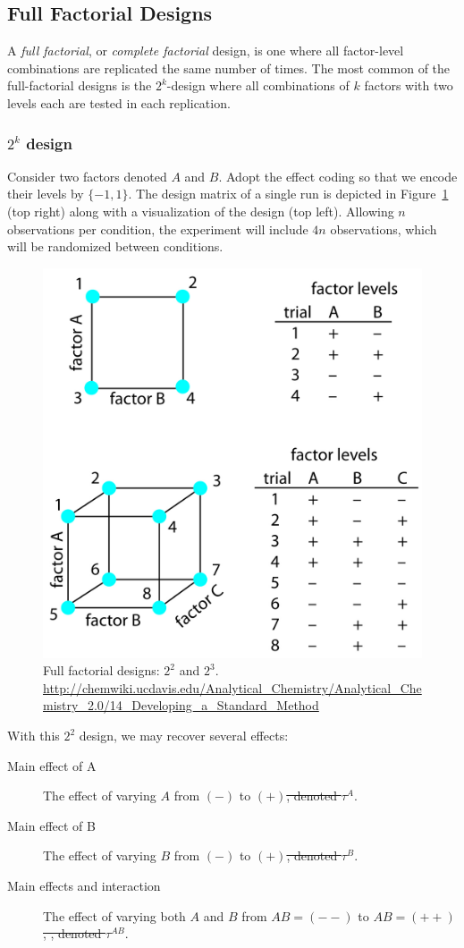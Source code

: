 \documentclass[12pt,a4paper]{report}
\theoremstyle{plain}
\theoremstyle{definition}
\newcommand{\set}[1]{\{ #1 \}} \newcommand{\setII}[1]{\left\{ #1 \right\}} \newcommand{\rv}[1]{\mathbf{#1}} \newcommand{\x}{\rv x} \newcommand{\y}{\rv y} \newcommand{\U}{\rv u} \newcommand{\T}{\rv t} \newcommand{\X}{\rv X} \newcommand{\Y}{\rv Y} \newcommand{\expect}[1]{\mathbf{E}\left[ #1 \right]} \newcommand{\expectg}[2]{\mathbf{E}_{\rv{#1}}\left[ \rv{#2} \right]} \newcommand{\expectn}[1]{\mathbb{E}\left[#1\right]} \newcommand{\cov}[1]{\mathbf{Cov} \left[ #1 \right]} \newcommand{\var}[1]{\mathop{Var} \left[ #1 \right]} \newcommand{\covn}[1]{\mathbb{Cov} \left[ #1 \right]} \newcommand{\gauss}[1]{\mathcal{N}\left(#1\right)} \newcommand{\cdf}[2]{F_{#1} (#2)} \newcommand{\survive}[2]{S_{#1} (#2)} \newcommand{\hazard}[2]{h_{#1} (#2)} \newcommand{\cuhazard}[2]{H_{#1} (#2)} \newcommand{\cdfn}[2]{\mathbb{F}_{#1}(#2)} \newcommand{\icdf}[2]{F_\rv{#1}^{-1} (#2)} \newcommand{\icdfn}[2]{\mathbb{F}^{-1}_{#1}(#2)} \newcommand{\pdf}[2]{p_{#1} (#2)} \newcommand{\prob}[1]{P\left( #1 \right)} \newcommand{\dist}{P} \newcommand{\density}{p}
\providecommand{\DIFdeltex}[1]{{\protect\color{red}\sout{#1}}}                      %
\providecommand{\DIFdelbegin}{} %
\providecommand{\DIFdelend}{} %
\providecommand{\DIFdel}[1]{\texorpdfstring{\DIFdeltex{#1}}{}} %
\begin{document}
\subsection{Full Factorial Designs}
A \emph{full factorial}, or \emph{complete factorial} design, is one where all factor-level combinations are replicated the same number of times.
The most common of the full-factorial designs is the $2^k$-design where all combinations of $k$ factors with two levels each are tested in each replication.



\subsubsection{$2^k$ design}
Consider two factors denoted $A$ and $B$.
Adopt the effect coding so that we encode their levels by $\set{-1,1}$.
The design matrix of a single run is depicted in Figure~\ref{fig:full_factorial} (top right) along with a visualization of the design (top left).
Allowing $n$ observations per condition, the experiment will include $4n$ observations, which will be randomized between conditions.

\begin{figure}[ht]
\centering
\includegraphics[width=0.7\linewidth, height=0.3\textheight]{art/full_factorial}
\caption[Full Factorial Design]{Full factorial designs: $2^2$ and $2^3$. \newline \url{http://chemwiki.ucdavis.edu/Analytical_Chemistry/Analytical_Chemistry_2.0/14_Developing_a_Standard_Method}}
\label{fig:full_factorial}
\end{figure}
With this $2^2$ design, we may recover several effects:
\begin{description}
\item [Main effect of A] The effect of varying $A$ from $(-)$ to $(+)$\DIFdelbegin \DIFdel{, denoted $\tau^A$}\DIFdelend .
\item [Main effect of B] The effect of varying $B$ from $(-)$ to $(+)$\DIFdelbegin \DIFdel{, denoted $\tau^B$}\DIFdelend .
\item [Main effects and interaction] The effect of varying both $A$ and $B$ from $AB=(--)$ to $AB=(++)$\DIFdelbegin \DIFdel{, , denoted $\tau^{AB}$}\DIFdelend .
\end{description}
\end{document}
